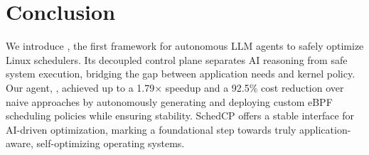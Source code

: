 \section{Conclusion}
\label{sec:conclusion}

We introduce \sys, the first framework for autonomous LLM agents to safely optimize Linux schedulers. Its decoupled control plane separates AI reasoning from safe system execution, bridging the gap between application needs and kernel policy. Our agent, \agent, achieved up to a 1.79× speedup and a 92.5\% cost reduction over naive approaches by autonomously generating and deploying custom eBPF scheduling policies while ensuring stability. SchedCP offers a stable interface for AI-driven optimization, marking a foundational step towards truly application-aware, self-optimizing operating systems.







